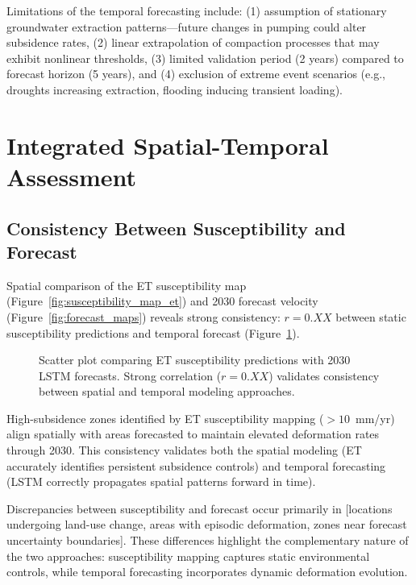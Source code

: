 Limitations of the temporal forecasting include: (1) assumption of stationary groundwater extraction patterns—future changes in pumping could alter subsidence rates, (2) linear extrapolation of compaction processes that may exhibit nonlinear thresholds, (3) limited validation period (2 years) compared to forecast horizon (5 years), and (4) exclusion of extreme event scenarios (e.g., droughts increasing extraction, flooding inducing transient loading).


\section{Integrated Spatial-Temporal Assessment}

\subsection{Consistency Between Susceptibility and Forecast}

Spatial comparison of the ET susceptibility map (Figure~\ref{fig:susceptibility_map_et}) and 2030 forecast velocity (Figure~\ref{fig:forecast_maps}) reveals strong consistency: $r = 0.XX$ between static susceptibility predictions and temporal forecast (Figure~\ref{fig:spatial_temporal_consistency}).

\begin{figure}[!t]
\centering
\caption{Scatter plot comparing ET susceptibility predictions with 2030 LSTM forecasts. Strong correlation ($r = 0.XX$) validates consistency between spatial and temporal modeling approaches.}
\label{fig:spatial_temporal_consistency}
\end{figure}

High-subsidence zones identified by ET susceptibility mapping ($>10$~mm/yr) align spatially with areas forecasted to maintain elevated deformation rates through 2030. This consistency validates both the spatial modeling (ET accurately identifies persistent subsidence controls) and temporal forecasting (LSTM correctly propagates spatial patterns forward in time).

Discrepancies between susceptibility and forecast occur primarily in [locations undergoing land-use change, areas with episodic deformation, zones near forecast uncertainty boundaries]. These differences highlight the complementary nature of the two approaches: susceptibility mapping captures static environmental controls, while temporal forecasting incorporates dynamic deformation evolution.

